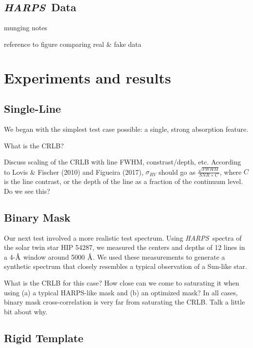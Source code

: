 \documentclass[modern]{aastex62}
\newcommand{\ang}{\text{\normalfont\AA}}
\newcommand{\acronym}[1]{{\small{#1}}}
\newcommand{\project}[1]{\textsl{#1}}
\newcommand{\HARPS}{\project{\acronym{HARPS}}}
\begin{document}
\begin{figure}
\centering
\caption{}
\label{fig:spectra}
\end{figure}

\subsection{\HARPS\ Data}

munging notes

reference to figure comparing real \& fake data

\section{Experiments and results}
\label{s:experiments}

\subsection{Single-Line}
\label{s:singleline}

We began with the simplest test case possible: a single, strong absorption feature.

What is the CRLB?

Discuss scaling of the CRLB with line FWHM, constrast/depth, etc. According to Lovis \& Fischer (2010) and Figueira (2017), $\sigma_{RV}$ should go as $\frac{\sqrt{FWHM}}{SNR \times C}$, where $C$ is the line contrast, or the depth of the line as a fraction of the continuum level. Do we see this?

\subsection{Binary Mask}

Our next test involved a more realistic test spectrum. Using \HARPS\ spectra of the solar twin star HIP 54287, we measured the centers and depths of 12 lines in a 4-$\ang$ window around 5000 $\ang$. We used these measurements to generate a synthetic spectrum that closely resembles a typical observation of a Sun-like star.

What is the CRLB for this case? How close can we come to saturating it when using (a) a typical HARPS-like mask and (b) an optimized mask? In all cases, binary mask cross-correlation is very far from saturating the CRLB. Talk a little bit about why.

\subsection{Rigid Template}
\end{document}
